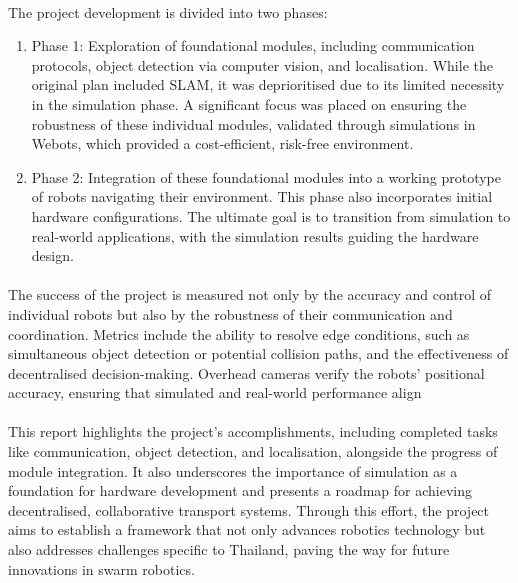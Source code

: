 \paragraph*{}
The project development is divided into two phases:

\begin{enumerate}
    \item Phase 1: Exploration of foundational modules, including communication protocols, object detection via computer vision, and localisation. While the original plan included SLAM, it was deprioritised due to its limited necessity in the simulation phase.  A significant focus was placed on ensuring the robustness of these individual modules, validated through simulations in Webots, which provided a cost-efficient, risk-free environment.
    \item Phase 2: Integration of these foundational modules into a working prototype of robots navigating their environment. This phase also incorporates initial hardware configurations. The ultimate goal is to transition from simulation to real-world applications, with the simulation results guiding the hardware design.
\end{enumerate}

\paragraph*{}
The success of the project is measured not only by the accuracy and control of individual robots but also by the robustness of their communication and coordination. Metrics include the ability to resolve edge conditions, such as simultaneous object detection or potential collision paths, and the effectiveness of decentralised decision-making. Overhead cameras verify the robots’ positional accuracy, ensuring that simulated and real-world performance align

\paragraph*{}
This report highlights the project’s accomplishments, including completed tasks like communication, object detection, and localisation, alongside the progress of module integration. It also underscores the importance of simulation as a foundation for hardware development and presents a roadmap for achieving decentralised, collaborative transport systems. Through this effort, the project aims to establish a framework that not only advances robotics technology but also addresses challenges specific to Thailand, paving the way for future innovations in swarm robotics.

